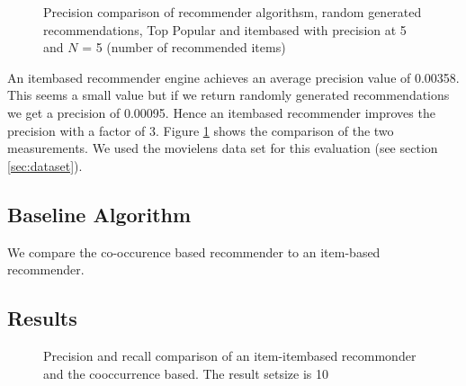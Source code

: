 \pgfplotsset{width=7cm}
\begin{figure}
  \centering
{} 
\caption{Precision comparison of recommender algorithsm, random generated recommendations, Top Popular and itembased with precision at 5 and $N$ = 5 (number of recommended items)}
  \label{fig:precisionrecallvalues}
\end{figure}

An itembased recommender engine achieves an average precision value of 0.00358. This seems a small value but if we return randomly generated recommendations we get a precision of 0.00095. Hence an itembased recommender improves the precision with a factor of 3. Figure \ref{fig:precisionrecallvalues} shows the comparison of the two measurements. We used the movielens data set for this evaluation (see section \ref{sec:dataset}).

\subsection{Baseline Algorithm}
\label{sec:baselinealgorithm}

We compare the co-occurence based recommender to an item-based recommender. 

\subsection{Results}
\label{sec:results}
\begin{figure}
  \centering
{} 
  \caption{Precision and recall comparison of an item-itembased recommonder and the cooccurrence based. The result setsize is 10}
  \label{fig:results}
\end{figure}
